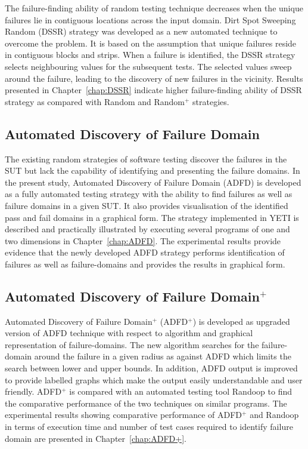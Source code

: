 The failure-finding ability of random testing technique decreases when the unique failures lie in contiguous locations across the input domain. Dirt Spot Sweeping Random (DSSR) strategy was developed as a new automated technique to overcome the problem. It is based on the assumption that unique failures reside in contiguous blocks and strips. When a failure is identified, the DSSR strategy selects neighbouring values for the subsequent tests. The selected values sweep around the failure, leading to the discovery of new failures in the vicinity. Results presented in Chapter~\ref{chap:DSSR} indicate higher failure-finding ability of DSSR strategy as compared with Random and Random$^+$ strategies.

\subsection{Automated Discovery of Failure Domain}
The existing random strategies of software testing discover the failures in the SUT but lack the capability of identifying and presenting the failure domains. In the present study, Automated Discovery of Failure Domain (ADFD) is developed as a fully automated testing strategy with the ability to find failures as well as failure domains in a given SUT. It also provides visualisation of the identified pass and fail domains in a graphical form. The strategy implemented in YETI is described and practically illustrated by executing several programs of one and two dimensions in Chapter~\ref{chap:ADFD}. The experimental results provide evidence that the newly developed ADFD strategy performs identification of failures as well as failure-domains and provides the results in graphical form.

\subsection{Automated Discovery of Failure Domain$^+$}
Automated Discovery of Failure Domain$^+$ (ADFD$^+$) is developed as upgraded version of ADFD technique with respect to algorithm and graphical representation of failure-domains. The new algorithm searches for the failure-domain around the failure in a given radius as against ADFD which limits the search between lower and upper bounds. In addition, ADFD output is improved to provide labelled graphs which make the output easily understandable and user friendly. ADFD$^+$ is compared with an automated testing tool Randoop to find the comparative performance of the two techniques on similar programs. 
The experimental results showing comparative performance of ADFD$^+$ and Randoop in terms of execution time and number of test cases required to identify failure domain are presented in Chapter~\ref{chap:ADFD+}.

